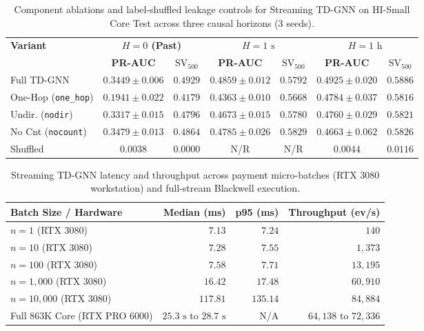 \documentclass[sigconf,nonacm]{acmart}
\begin{document}
\begin{table}[t]
\centering
\caption{Component ablations and label-shuffled leakage controls for Streaming TD-GNN on HI-Small Core Test across three causal horizons (3 seeds).}
\label{tab:ablations}
\scriptsize
\setlength{\tabcolsep}{1.6pt}
\begin{tabular}{lcccccc}
\toprule
\textbf{Variant} & \multicolumn{2}{c}{\textbf{$H = 0$ (Past)}} & \multicolumn{2}{c}{\textbf{$H = 1\text{ s}$}} & \multicolumn{2}{c}{\textbf{$H = 1\text{ h}$}} \\
\cmidrule(lr){2-3} \cmidrule(lr){4-5} \cmidrule(lr){6-7}
 & \textbf{PR-AUC} & \textbf{$\text{SV}_{500}$} & \textbf{PR-AUC} & \textbf{$\text{SV}_{500}$} & \textbf{PR-AUC} & \textbf{$\text{SV}_{500}$} \\
\midrule
Full TD-GNN & $0.3449 \pm 0.006$ & $0.4929$ & $0.4859 \pm 0.012$ & $0.5792$ & $0.4925 \pm 0.020$ & $0.5886$ \\
One-Hop (\texttt{one\_hop}) & $0.1941 \pm 0.022$ & $0.4179$ & $0.4363 \pm 0.010$ & $0.5668$ & $0.4784 \pm 0.037$ & $0.5816$ \\
Undir. (\texttt{nodir}) & $0.3317 \pm 0.015$ & $0.4796$ & $0.4673 \pm 0.015$ & $0.5780$ & $0.4760 \pm 0.029$ & $0.5821$ \\
No Cnt (\texttt{nocount}) & $0.3479 \pm 0.013$ & $0.4864$ & $0.4785 \pm 0.026$ & $0.5829$ & $0.4663 \pm 0.062$ & $0.5826$ \\
Shuffled & $0.0038$ & $0.0000$ & N/R & N/R & $0.0044$ & $0.0116$ \\
\bottomrule
\end{tabular}
\end{table}

\begin{table}[t]
\centering
\caption{Streaming TD-GNN latency and throughput across payment micro-batches (RTX 3080 workstation) and full-stream Blackwell execution.}
\label{tab:service_latency}
\scriptsize
\setlength{\tabcolsep}{2.0pt}
\begin{tabular}{lrrr}
\toprule
\textbf{Batch Size / Hardware} & \textbf{Median (ms)} & \textbf{p95 (ms)} & \textbf{Throughput (ev/s)} \\
\midrule
$n = 1$ (RTX 3080) & $7.13$ & $7.24$ & $140$ \\
$n = 10$ (RTX 3080) & $7.28$ & $7.55$ & $1{,}373$ \\
$n = 100$ (RTX 3080) & $7.58$ & $7.71$ & $13{,}195$ \\
$n = 1{,}000$ (RTX 3080) & $16.42$ & $17.48$ & $60{,}910$ \\
$n = 10{,}000$ (RTX 3080) & $117.81$ & $135.14$ & $84{,}884$ \\
\midrule
Full $863\text{K}$ Core (RTX PRO 6000) & $25.3\text{ s}$ to $28.7\text{ s}$ & N/A & $64{,}138$ to $72{,}336$ \\
\bottomrule
\end{tabular}
\end{table}
\end{document}

